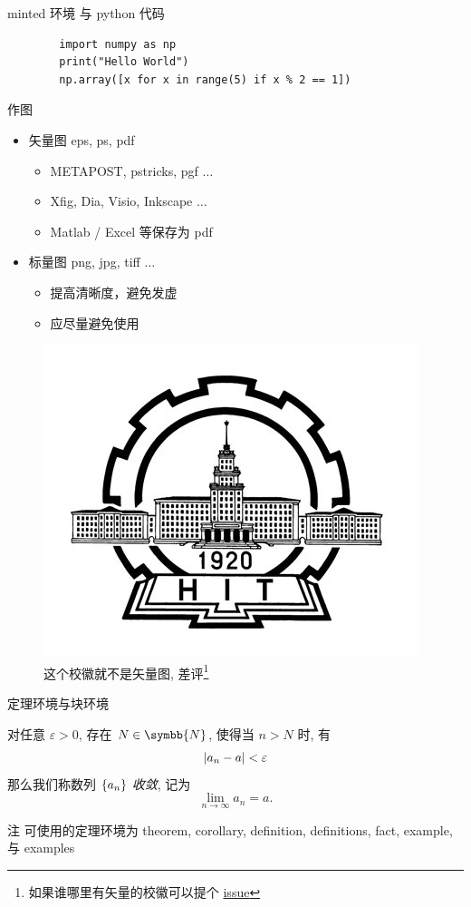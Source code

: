 \documentclass{beamer}
\begin{document}
\begin{frame}[fragile]{minted 环境 与 python 代码}
    \begin{verbatim}
        import numpy as np
        print("Hello World")
        np.array([x for x in range(5) if x % 2 == 1])
    \end{verbatim}
\end{frame}

\begin{frame}{作图}
    \begin{itemize}
        \item 矢量图 eps, ps, pdf
        \begin{itemize}
            \item METAPOST, pstricks, pgf $\ldots$
            \item Xfig, Dia, Visio, Inkscape $\ldots$
            \item Matlab / Excel 等保存为 pdf
        \end{itemize}
        \item 标量图 png, jpg, tiff $\ldots$
        \begin{itemize}
            \item 提高清晰度，避免发虚
            \item 应尽量避免使用
        \end{itemize}
    \end{itemize}
    \begin{figure}[htpb]
        \centering
        \includegraphics[width=0.2\linewidth]{pic/hit.png}
        \caption{这个校徽就不是矢量图, 差评\footnote{如果谁哪里有矢量的校徽可以提个 \href{https://github.com/syvshc/HITBeamer/issues}{issue}}}
    \end{figure}
    
\end{frame}

\begin{frame}{定理环境与块环境}
    \begin{definition}[数列极限]
        对任意 $ \varepsilon>0 $, 存在 $ N\in\symbb{N} $, 使得当 $ n>N $ 时, 有
        \[
            \abs{a_{n}-a}<\varepsilon
        \]   
        那么我们称数列 $ \qty{a_{n}} $ \emph{收敛}, 记为
        \[
            \lim_{n\to\infty}a_{n}=a.
        \]
    \end{definition}
    \begin{block}{注}
        可使用的定理环境为 theorem, corollary, definition, definitions, fact, example, 与 examples  
    \end{block}
\end{frame}
\end{document}
